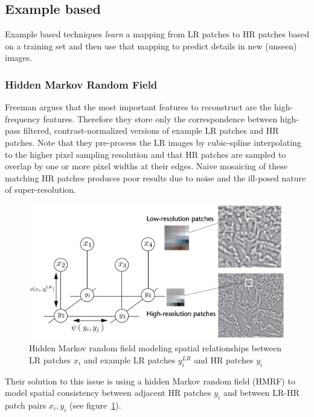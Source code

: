 \subsection{Example based}\label{subsec:example-based}

Example based techniques \textit{learn} a mapping from
LR patches to HR patches based on a training set and then use that mapping to predict details in new (unseen) images.

\subsubsection{Hidden Markov Random Field}

Freeman \etal\cite{freeman2002example} argues that the most important features to reconstruct are the high-frequency features.
%
Therefore they store only the correspondence between high-pass filtered, contrast-normalized versions of example LR patches and HR patches.
%
Note that they pre-process the LR images by cubic-spline interpolating to the higher pixel sampling resolution and that HR patches are sampled to overlap by one or more pixel widths at their edges.
%
Naive mosaicing of these matching HR patches produces poor results due to noise and the ill-posed nature of super-resolution.
%
\begin{figure}
    \centering
    \includegraphics[width=\linewidth,keepaspectratio]{figures/mrf.png}
    \caption{Hidden Markov random field modeling spatial relationships between LR patches $x_i$ and example LR patches $y_i^{LR}$ and HR patches $y_i$\cite{freeman2002example}}
    \label{fig:mrf}
\end{figure}
Their solution to this issue is using a hidden Markov random field (HMRF) to model spatial consistency between adjacent HR patches $y_i$ and between LR-HR patch pairs $x_i, y_i$ (see figure~\ref{fig:mrf}).

